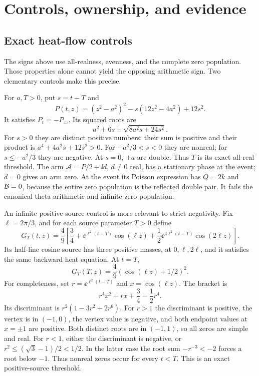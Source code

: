 \section{Controls, ownership, and evidence}\label{sec:controls}

\subsection{Exact heat-flow controls}

The signs above use all-realness, evenness, and the complete zero
population. Those properties alone cannot yield the opposing
arithmetic sign. Two elementary controls make this precise.

For \(a,T>0\), put \(s=t-T\) and
\begin{equation}\label{eq:polynomial}
 P(t,z)=(z^2-a^2)^2-s(12z^2-4a^2)+12s^2.
\end{equation}
It satisfies \(P_t=-P_{zz}\). Its squared roots are
\[
 a^2+6s\pm\sqrt{8a^2s+24s^2}.
\]
For \(s>0\) they are distinct positive numbers: their sum is positive
and their product is \(a^4+4a^2s+12s^2>0\).
For \(-a^2/3<s<0\) they are nonreal; for \(s\le-a^2/3\) they are
negative. At \(s=0\), \(\pm a\) are double. Thus \(T\) is its exact
all-real threshold. The arm \(\mathscr A=P/2+\ii d\), \(d\ne0\) real,
has a stationary phase at the event; \(d=0\) gives an arm zero.
At the event its Poisson expression has \(Q=2k\) and \(\mathcal B=0\),
because the entire zero population is the reflected double pair.
It fails the canonical theta arithmetic and infinite zero population.

An infinite positive-source control is more relevant to strict
negativity. Fix \(\ell=2\pi/3\), and for each source parameter \(T>0\)
define
\begin{equation}\label{eq:atomic}
 G_T(t,z)=\frac49\left[\frac34+\ee^{\ell^2(t-T)}\cos(\ell z)
                 +\frac12\ee^{4\ell^2(t-T)}\cos(2\ell z)\right].
\end{equation}
Its half-line cosine source has three positive masses, at \(0,\ell,2\ell\),
and it satisfies the same backward heat equation. At \(t=T\),
\[
 G_T(T,z)=\frac49(\cos(\ell z)+1/2)^2.
\]
For completeness, set \(r=\ee^{\ell^2(t-T)}\) and \(x=\cos(\ell z)\).
The bracket is
\[
 r^4x^2+rx+\frac34-\frac12r^4.
\]
Its discriminant is \(r^2(1-3r^2+2r^6)\).
For \(r>1\) the discriminant is positive, the vertex is in \((-1,0)\),
the vertex value is negative, and both endpoint values at \(x=\pm1\)
are positive. Both distinct roots are in \((-1,1)\), so all zeros
are simple and real. For \(r<1\), either the discriminant is negative,
or \(r^2\le(\sqrt3-1)/2<1/2\). In the latter case the root sum
\(-r^{-3}<-2\) forces a root below \(-1\). Thus nonreal zeros occur
for every \(t<T\). This is an exact positive-source threshold.

